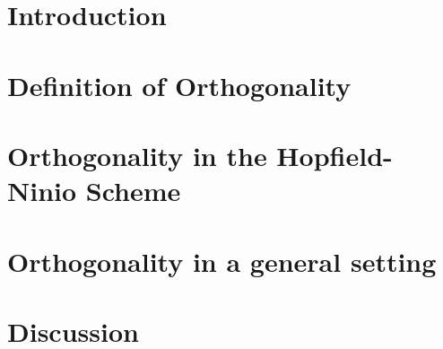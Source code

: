 \documentclass[reprint,amsmath,amssymb,aps,prx,superscriptaddress]{revtex4-2}
\begin{document}

\section{Introduction}

\section{Definition of Orthogonality}

\section{Orthogonality in the Hopfield-Ninio Scheme}

\section{Orthogonality in a general setting}

\section{Discussion}





\appendix
\appendixpage








\end{document}
